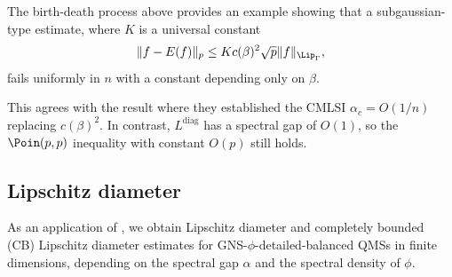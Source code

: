 \documentclass[sn-mathphys-num]{sn-jnl}
\begin{document}
The birth-death process above provides an example showing that a subgaussian-type estimate, where $K$ is a universal constant
\[
\|f-E(f)\|_p \le Kc(\beta)^2\sqrt p \|f\|_{\Lip_\Gamma},
\]
fails uniformly in $n$ with a constant depending only on $\beta$.

This agrees with the result \cite[Thm~5.7]{Gao_Junge_LaRacuente_Li_2025} where they established the CMLSI $\alpha_c=O(1/n)$ replacing $c(\beta)^2$.
In contrast, $L^{\mathrm{diag}}$ has a spectral gap of $O(1)$, so the $\Poin(p,p)$ inequality with constant $O(p)$ still holds.

\subsection{Lipschitz diameter}
As an application of , we obtain Lipschitz diameter and completely bounded (CB) Lipschitz diameter estimates for GNS-$\phi$-detailed-balanced QMSs in finite dimensions, depending on the spectral gap $\alpha$ and the spectral density of $\phi$.
\end{document}
